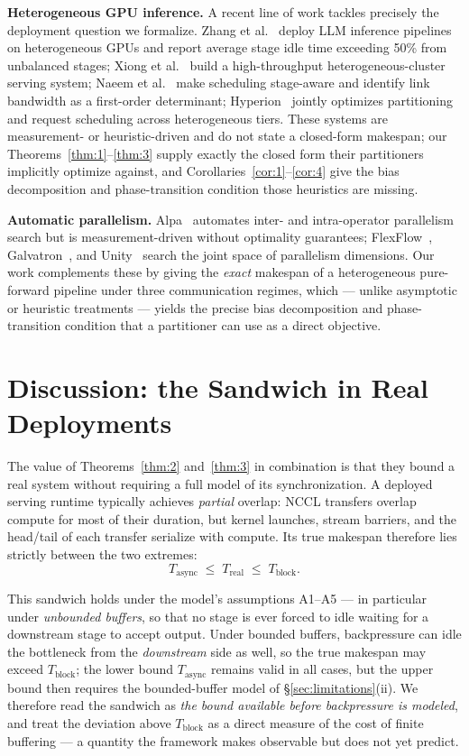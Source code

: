 \documentclass[11pt]{article}
\begin{document}
\textbf{Heterogeneous GPU inference.} A recent line of work tackles precisely the deployment question we formalize. Zhang et al.~\cite{r25} deploy LLM inference pipelines on heterogeneous GPUs and report average stage idle time exceeding 50\% from unbalanced stages; Xiong et al.~\cite{r26} build a high-throughput heterogeneous-cluster serving system; Naeem et al.~\cite{r27} make scheduling stage-aware and identify link bandwidth as a first-order determinant; Hyperion~\cite{r28} jointly optimizes partitioning and request scheduling across heterogeneous tiers. These systems are measurement- or heuristic-driven and do not state a closed-form makespan; our Theorems~\ref{thm:1}--\ref{thm:3} supply exactly the closed form their partitioners implicitly optimize against, and Corollaries~\ref{cor:1}--\ref{cor:4} give the bias decomposition and phase-transition condition those heuristics are missing.

\textbf{Automatic parallelism.} Alpa~\cite{r29} automates inter- and intra-operator parallelism search but is measurement-driven without optimality guarantees; FlexFlow~\cite{r30}, Galvatron~\cite{r31}, and Unity~\cite{r32} search the joint space of parallelism dimensions. Our work complements these by giving the \emph{exact} makespan of a heterogeneous pure-forward pipeline under three communication regimes, which --- unlike asymptotic or heuristic treatments --- yields the precise bias decomposition and phase-transition condition that a partitioner can use as a direct objective.

\section{Discussion: the Sandwich in Real Deployments}\label{sec:discussion}

The value of Theorems~\ref{thm:2} and~\ref{thm:3} in combination is that they bound a real system without requiring a full model of its synchronization. A deployed serving runtime typically achieves \emph{partial} overlap: NCCL transfers overlap compute for most of their duration, but kernel launches, stream barriers, and the head/tail of each transfer serialize with compute. Its true makespan therefore lies strictly between the two extremes:
\[
T_{\text{async}} \;\le\; T_{\text{real}} \;\le\; T_{\text{block}} .
\]

This sandwich holds under the model's assumptions A1--A5 --- in particular under \emph{unbounded buffers}, so that no stage is ever forced to idle waiting for a downstream stage to accept output. Under bounded buffers, backpressure can idle the bottleneck from the \emph{downstream} side as well, so the true makespan may exceed $T_{\text{block}}$; the lower bound $T_{\text{async}}$ remains valid in all cases, but the upper bound then requires the bounded-buffer model of \S\ref{sec:limitations}(ii). We therefore read the sandwich as \emph{the bound available before backpressure is modeled}, and treat the deviation above $T_{\text{block}}$ as a direct measure of the cost of finite buffering --- a quantity the framework makes observable but does not yet predict.
\end{document}

